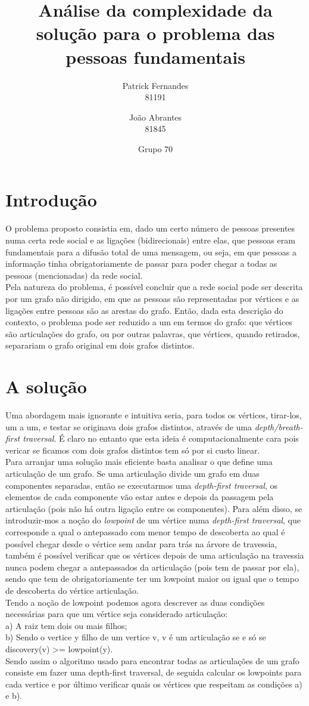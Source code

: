 \documentclass[12pt]{article}
\title{Análise da complexidade da solução para o problema das pessoas fundamentais}
\author{Patrick Fernandes\\81191 \and João Abrantes\\81845}
\date{Grupo 70}
\begin{document}
\maketitle
\section{Introdução}
O problema proposto consistia em, dado um certo número de pessoas presentes numa certa rede social e as ligações (bidirecionais) entre elas, que pessoas eram fundamentais para a difusão total de uma mensagem, ou seja, em que pessoas a informação tinha obrigatoriamente de passar para poder chegar a todas as pessoas (mencionadas) da rede social.\\
Pela natureza do problema, é possível concluir que a rede social pode ser descrita por um grafo não dirigido, em que as pessoas são representadas por vértices e as ligações entre pessoas são as arestas do grafo. Então, dada esta descrição do contexto, o problema pode ser reduzido a um em termos do grafo: que vértices são articulações do grafo, ou por outras palavras, que vértices, quando retirados, separariam o grafo original em dois grafos distintos.
\section{A solução}
Uma abordagem mais ignorante e intuitiva seria, para todos os vértices, tirar-los, um a um, e testar se originava dois grafos distintos, através de uma \textit{depth/breath-first traversal}. É claro no entanto que esta ideia é computacionalmente cara pois vericar se ficamos com dois grafos distintos tem só por si custo linear. \\ 
Para arranjar uma solução mais eficiente basta analisar o que define uma articulação de um grafo. Se uma articulação divide um grafo em duas componentes separadas, então se executarmos uma \textit{depth-first traversal}, os elementos de cada componente vão estar antes e depois da passagem pela articulação (pois não há outra ligação entre os componentes). Para além disso, se introduzir-mos a noção do \textit{lowpoint} de um vértice numa \textit{depth-first traversal}, que corresponde a qual o antepassado com menor tempo de descoberta ao qual é possível chegar desde o vértice sem andar para trás na árvore de travessia, também é possível verificar que os vértices depois de uma articulação na travessia nunca podem chegar a antepassados da articulação (pois tem de passar por ela), sendo que tem de obrigatoriamente ter um lowpoint maior ou igual que o tempo de descoberta do vértice articulação.\\
Tendo a noção de lowpoint podemos agora descrever as duas condições necessárias para que um vértice seja considerado articulação: \\
a) A raiz tem dois ou mais filhos;\\
b) Sendo o vertice y filho de um vertice v, v é um articulação se e só se discovery(v) >= lowpoint(y).\\
Sendo assim o algoritmo usado para encontrar todas as articulações de um grafo consiste em fazer uma depth-first traversal, de seguida calcular os lowpoints para cada vertice e por último verificar quais os vértices que respeitam as condições a) e b).\\
\end{document}
